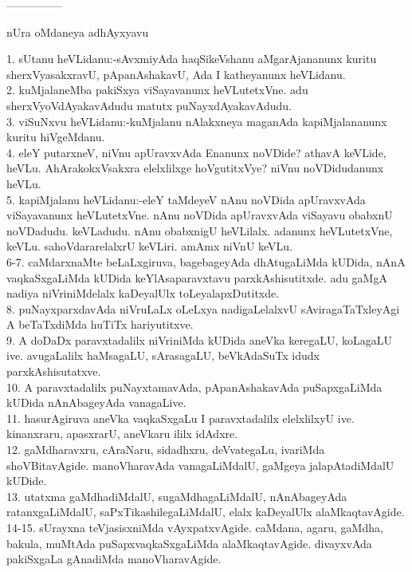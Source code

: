 \documentclass{article}
\begin{document}
\begin{center}
---------------
\end{center}

\begin{center}
nUra oMdaneya adhAyxyavu
\end{center}

1. sUtanu heVLidanu:-sAvxmiyAda haqSikeVshanu aMgarAjananunx kuritu sherxVyasakxravU, pApanAshakavU, Ada I katheyanunx heVLidanu.\\
2. kuMjalaneMba pakiSxya viSayavanunx heVLutetxVne. adu sherxVyoVdAyakavAdudu matutx puNayxdAyakavAdudu.\\
3. viSuNxvu heVLidanu:-kuMjalanu nAlakxneya maganAda kapiMjalananunx kuritu hiVgeMdanu.\\
4. eleY putarxneV, niVnu apUravxvAda Enanunx noVDide? athavA keVLide, heVLu. AhArakokxVsakxra elelxlilxge hoVgutitxVye? niVnu noVDidudanunx heVLu.\\
5. kapiMjalanu heVLidanu:-eleY taMdeyeV nAnu noVDida apUravxvAda viSayavanunx heVLutetxVne. nAnu noVDida apUravxvAda viSayavu obabxnU noVDadudu. keVLadudu. nAnu obabxnigU heVLilalx. adanunx heVLutetxVne, keVLu. sahoVdararelalxrU keVLiri. amAmx niVnU keVLu.\\
6-7. caMdarxnaMte beLaLxgiruva, bagebageyAda dhAtugaLiMda kUDida, nAnA vaqkaSxgaLiMda kUDida keYlAsaparavxtavu parxkAshisutitxde. adu gaMgA nadiya niVriniMdelalx kaDeyalUlx toLeyalapxDutitxde.\\
8. puNayxparxdavAda niVruLaLx oLeLxya nadigaLelalxvU sAviragaTaTxleyAgi A beTaTxdiMda huTiTx hariyutitxve.\\
9. A doDaDx paravxtadalilx niVriniMda kUDida aneVka keregaLU, koLagaLU ive. avugaLalilx haMsagaLU, sArasagaLU, beVkAdaSuTx idudx parxkAshisutatxve.\\
10. A paravxtadalilx puNayxtamavAda, pApanAshakavAda puSapxgaLiMda kUDida nAnAbageyAda vanagaLive.\\
11. hasurAgiruva aneVka vaqkaSxgaLu I paravxtadalilx elelxlilxyU ive. kinanxraru, apasxrarU, aneVkaru ililx idAdxre.\\
12. gaMdharavxru, cAraNaru, sidadhxru, deVvategaLu, ivariMda shoVBitavAgide. manoVharavAda vanagaLiMdalU, gaMgeya jalapAtadiMdalU kUDide.\\
13. utatxma gaMdhadiMdalU, sugaMdhagaLiMdalU, nAnAbageyAda ratanxgaLiMdalU, saPxTikashilegaLiMdalU, elalx kaDeyalUlx alaMkaqtavAgide.\\
14-15. sUrayxna teVjasisxniMda vAyxpatxvAgide. caMdana, agaru, gaMdha, bakula, muMtAda puSapxvaqkaSxgaLiMda alaMkaqtavAgide. divayxvAda pakiSxgaLa gAnadiMda manoVharavAgide.\\
\end{document}
